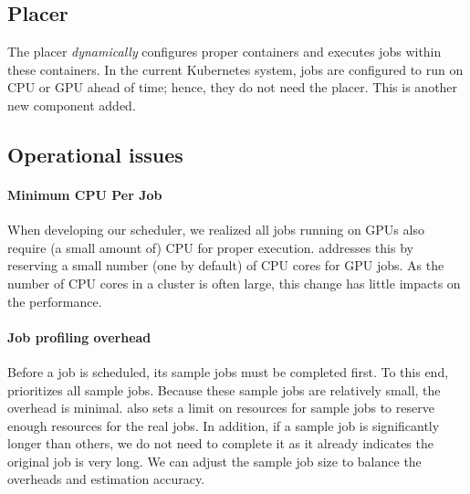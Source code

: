 


\subsection{Placer}
The placer \emph{dynamically} configures proper containers and executes jobs within these containers.
In the current Kubernetes system, jobs are configured to run on CPU or GPU ahead of time; hence, they do not need the placer.
This is another new component added.%

\subsection{Operational issues}

\paragraph{Minimum CPU Per Job}
When developing our scheduler, we realized all jobs running on GPUs also require (a small amount of) CPU for proper execution.
\name addresses this by reserving a small number (one by default) of CPU cores for GPU jobs.%
As the number of CPU cores in a cluster is often large, this change has little impacts on the performance.

\paragraph{Job profiling overhead}
Before a job is scheduled, its sample jobs must be completed first. 
To this end, \name prioritizes all sample jobs. 
Because these sample jobs are relatively small, the overhead is minimal.  
\name also sets a limit on resources for sample jobs to reserve enough resources for the real jobs. In addition, if a sample job is significantly longer than others, we do not need to complete it as it already indicates the original job is very long. We can adjust the sample job size to balance the overheads and estimation accuracy.

